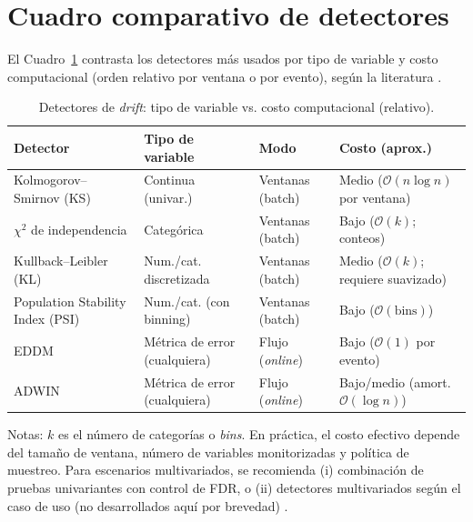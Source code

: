 \section{Cuadro comparativo de detectores}
\label{subsec:cuadro-detectores}
El Cuadro~\ref{tab:comparativa-detectores} contrasta los detectores más usados por tipo de variable y costo computacional (orden relativo por ventana o por evento), según la literatura \citep{Gama2014, Lu2019, Bifet2010, BaenaGarcia2006, Sethi2017}.

\begin{table}[htbp]
\centering
\caption{Detectores de \textit{drift}: tipo de variable vs. costo computacional (relativo).}
\label{tab:comparativa-detectores}

\small
\begin{tabularx}{\textwidth}{l l l >{\raggedright\arraybackslash}X}
\toprule
\textbf{Detector} &
\textbf{Tipo de variable} &
\textbf{Modo} &
\textbf{Costo (aprox.)} \\
\midrule

Kolmogorov--Smirnov (KS) &
Continua (univar.) &
Ventanas (batch) &
Medio ($\mathcal{O}(n\log n)$ por ventana) \\

$\chi^2$ de independencia &
Categórica &
Ventanas (batch) &
Bajo ($\mathcal{O}(k)$; conteos) \\

Kullback--Leibler (KL) &
Num./cat. discretizada &
Ventanas (batch) &
Medio ($\mathcal{O}(k)$; requiere suavizado) \\

Population Stability Index (PSI) &
Num./cat. (con binning) &
Ventanas (batch) &
Bajo ($\mathcal{O}(\text{bins})$) \\

EDDM \citep{BaenaGarcia2006} &
Métrica de error (cualquiera) &
Flujo (\textit{online}) &
Bajo ($\mathcal{O}(1)$ por evento) \\

ADWIN \citep{Bifet2010} &
Métrica de error (cualquiera) &
Flujo (\textit{online}) &
Bajo/medio (amort. $\mathcal{O}(\log n)$) \\

\bottomrule
\end{tabularx}

\end{table}


Notas: $k$ es el número de categorías o \textit{bins}. En práctica, el costo efectivo depende del tamaño de ventana, número de variables monitorizadas y política de muestreo. Para escenarios multivariados, se recomienda (i) combinación de pruebas univariantes con control de FDR, o (ii) detectores multivariados según el caso de uso (no desarrollados aquí por brevedad) \citep{Lu2019, Gama2014}.

